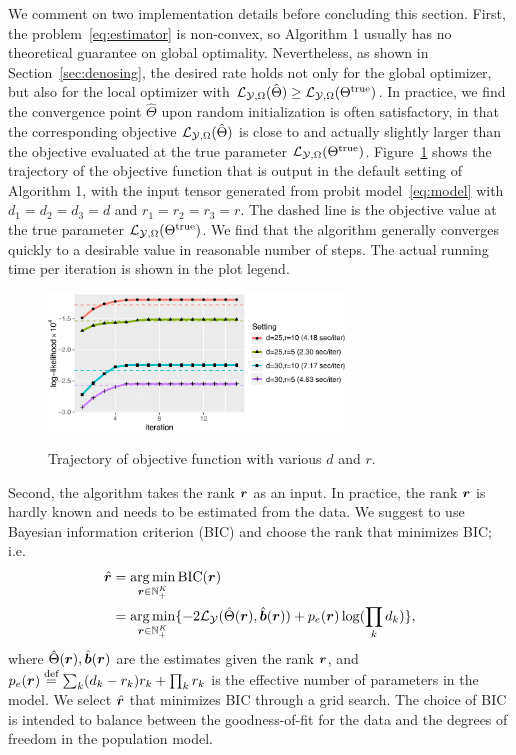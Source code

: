 \documentclass[11pt]{article}
\theoremstyle{plain}
\theoremstyle{definition}
\providecommand{\DIFdelbegin}{} %
\providecommand{\DIFaddbeginFL}{} %
\providecommand{\DIFaddendFL}{} %
\providecommand{\DIFdelendFL}{} %
\begin{document}
We comment on two implementation details before concluding this section. First, the problem~\eqref{eq:estimator} is non-convex, so Algorithm 1 usually has no theoretical guarantee on global optimality. Nevertheless, as shown in Section~\ref{sec:denosing}, the desired rate holds not only for the global optimizer, but also for the local optimizer with $\mathcal{L}_{\mathcal{Y},\Omega}(\hat \Theta)\geq \mathcal{L}_{\mathcal{Y},\Omega}(\Theta^{\text{true}})$. In practice, we find the convergence point $\hat \Theta$ upon random initialization is often satisfactory, in that the corresponding objective $\mathcal{L}_{\mathcal{Y},\Omega}(\hat \Theta)$ is close to and actually slightly larger than the objective evaluated at the true parameter $\mathcal{L}_{\mathcal{Y},\Omega}(\Theta^{\text{true}})$. Figure~\ref{fig:stability} shows the trajectory of the objective function that is output in the default setting of Algorithm 1, with the input tensor generated from probit model~\eqref{eq:model} with $d_1=d_2=d_3=d$ and $r_1=r_2=r_3=r$. The dashed line is the objective value at the true parameter $\mathcal{L}_{\mathcal{Y},\Omega}(\Theta^{\text{true}})$. We find that the algorithm generally converges quickly to a desirable value in reasonable number of steps. The actual running time per iteration is shown in the plot legend.

\DIFdelbegin %
\DIFdelendFL \DIFaddbeginFL \begin{figure}[ht]
\DIFaddendFL \centering
\includegraphics[width=0.7\textwidth]{algorithm.pdf}\label{fig:stability}
\caption{Trajectory of objective function with various $d$ and $r$.}
\end{figure}



Second, the algorithm takes the rank $\bm{r}$ as an input. In practice, the rank $\bm{r}$ is hardly known and needs to be estimated from the data. We suggest to use Bayesian information criterion (BIC) and choose the rank that minimizes BIC; i.e.
\begin{align}\label{eq:BIC}
\hat {\bm{r}}&=\operatorname*{arg\,min}_{\bm{r}\in\mathbb{N}^K_{+}} \text{BIC}(\bm{r})\\
&=\operatorname*{arg\,min}_{\bm{r}\in\mathbb{N}^K_{+}}\{-2\mathcal{L}_{\mathcal{Y}}(\hat \Theta(\bm{r}),\hat {\bm{b}}(\bm{r}))+p_e(\bm{r})\log (\prod_k d_k)\},
\end{align}
where $\hat \Theta(\bm{r}), \hat{\bm{b}}(\bm{r})$ are the estimates given the rank $\bm{r}$, and $p_e(\bm{r})\stackrel{\text{def}}{=}\sum_k (d_k-r_k)r_k+\prod_k r_k$ is the effective number of parameters in the model. We select $\hat {\bm{r}}$ that minimizes BIC through a grid search. The choice of BIC is intended to balance between the goodness-of-fit for the data and the degrees of freedom in the population model.
\end{document}
